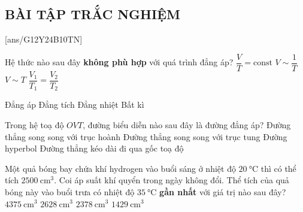 \subsection{BÀI TẬP TRẮC NGHIỆM}
\setcounter{ex}{0}
[ans/G12Y24B10TN]
\begin{ex}
	Hệ thức nào sau đây \textbf{không phù hợp} với quá trình đẳng áp?
	\choice
	{$\dfrac{V}{T}=\text{const}$}
	{\True $V\sim\dfrac{1}{T}$}
	{$V\sim T$}
	{$\dfrac{V_1}{T_1}=\dfrac{V_2}{T_2}$}
	\loigiai{}
\end{ex}
\begin{ex}
	\choice
	{\True Đẳng áp}
	{Đẳng tích}
	{Đẳng nhiệt}
	{Bất kì}
	\loigiai{}
\end{ex}
\begin{ex}
	Trong hệ toạ độ $OVT$, đường biểu diễn nào sau đây là đường đẳng áp?
	\choice
	{Đường thẳng song song với trục hoành}
	{Đường thẳng song song với trục tung}
	{Đường hyperbol}
	{\True Đường thẳng kéo dài đi qua gốc toạ độ}
	\loigiai{}
\end{ex}
\begin{ex}
	Một quả bóng bay chứa khí hydrogen vào buổi sáng ở nhiệt độ $\SI{20}{\celsius}$ thì có thể tích $\SI{2500}{\centi\meter^3}$. Coi áp suất khí quyển trong ngày không đổi. Thể tích của quả bóng này vào buổi trưa có nhiệt độ $\SI{35}{\celsius}$ \textbf{gần nhất} với giá trị nào sau đây?
	\choice
	{$\SI{4375}{\centi\meter^3}$}
	{\True $\SI{2628}{\centi\meter^3}$}
	{$\SI{2378}{\centi\meter^3}$}
	{$\SI{1429}{\centi\meter^3}$}
\end{ex}
